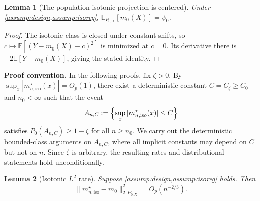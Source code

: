 \documentclass{article}
\theoremstyle{plain}
\newtheorem{lemma}{Lemma}
\theoremstyle{definition}
\newcommand{\E}{\mathbb{E}}
\newcommand{\1}{\mathbbm{1}}
\newcommand{\Px}{P_{0,X}}
\begin{document}
\begin{lemma}[The population isotonic projection is centered]
\label{lem:center}
Under \cref{assump:design,assump:isoreg},
\(\E_{\Px}[m_0(X)]=\psi_0\).
\end{lemma}
\begin{proof}
The isotonic class is closed under constant shifts, so
\(c\mapsto\E[(Y-m_0(X)-c)^2]\) is minimized at \(c=0\).
Its derivative there is \(-2\E[Y-m_0(X)]\), giving the stated identity.
\end{proof}

\textbf{Proof convention.} In the following proofs, fix \(\zeta>0\). By \(\sup_x |m_{n,\mathrm{iso}}^\star(x)|=O_p(1)\), there exist a deterministic constant \(C=C_\zeta\ge C_0\) and \(n_0<\infty\) such that the event
\[
A_{n,C}:=\Bigl\{\sup_x |m_{n,\mathrm{iso}}^\star(x)|\le C\Bigr\}
\]
satisfies \(P_0(A_{n,C})\ge 1-\zeta\) for all \(n\ge n_0\). We carry out the deterministic bounded-class arguments on \(A_{n,C}\), where all implicit constants may depend on \(C\) but not on \(n\). Since \(\zeta\) is arbitrary, the resulting rates and distributional statements hold unconditionally.

\begin{lemma}[Isotonic \(L^2\) rate]
\label{lem:isorate}
Suppose \cref{assump:design,assump:isoreg} holds. Then
\[
\|m_{n,\mathrm{iso}}^\star-m_0\|_{2,\Px}^2=O_p(n^{-2/3}).
\]
\end{lemma}
\end{document}
